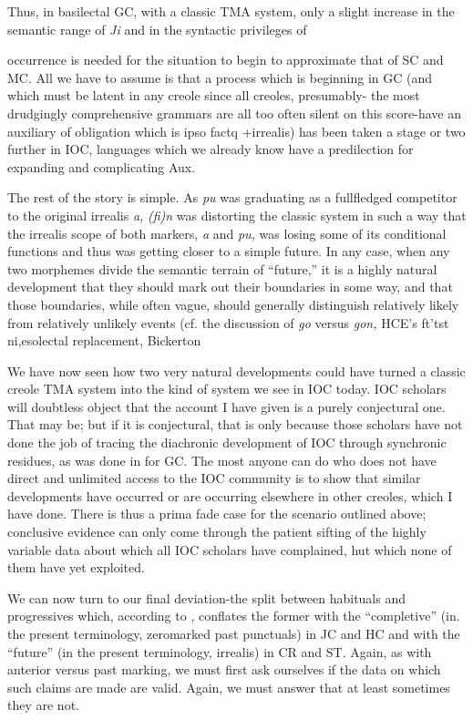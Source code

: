Thus, in basilectal GC, with a classic TMA system, only a slight increase in the semantic range of \textit{Ji} and in the syntactic privileges of

occurrence is needed for the situation to begin to approximate that of SC and MC. All we have to assume is that a process which is beginning in GC (and which must be latent in any creole since all creoles, presumably- the most drudgingly comprehensive grammars are all too often silent on this score-have an auxiliary of obligation which is ipso factq +irrealis) has been taken a stage or two further in IOC, languages which we already know have a predilection for expanding and complicating Aux.

The rest of the story is simple. As \textit{pu} was graduating as a full\-fledged competitor to the original irrealis \textit{a,} \textit{(fi)n} was distorting the classic system in such a way that the irrealis scope of both markers, \textit{a} and \textit{pu,} was losing some of its conditional functions and thus was getting closer to a simple future. In any case, when any two mor\-phemes divide the semantic terrain of ``future,'' it is a highly natural development that they should mark out their boundaries in some way, and that those boundaries, while often vague, should generally dis\-tinguish relatively likely from relatively unlikely events (cf. the discus\-sion of \textit{go} versus \textit{gon,} HCE's ft'tst ni,esolectal replacement, Bickerton

We have now seen how two very natural developments could
have turned a classic creole TMA system into the kind of system we see in IOC today. IOC scholars will doubtless object that the account I have given is a purely conjectural one. That may be; but if it is con\-jectural, that is only because those scholars have not done the job of tracing the diachronic development of IOC through synchronic resi\-dues, as was done in \citet{Bickerton1975} for GC. The most anyone can do who does not have direct and unlimited access to the IOC commun\-ity is to show that similar developments have occurred or are occurring elsewhere in other creoles, which I have done. There is thus a prima fade case for the scenario outlined above; conclusive evidence can only come through the patient sifting of the highly variable data about which all IOC scholars have complained, hut which none of them have yet exploited.

We can now turn to our final deviation-the split between habi\-tuals and progressives which, according to \citet{Taylor1971}, conflates the former with the ``completive'' (in. the present terminology, zero\-marked past punctuals) in JC and HC and with the ``future'' (in the present terminology, irrealis) in CR and ST. Again, as with anterior versus past marking, we must first ask ourselves if the data on which such claims are made are valid. Again, we must answer that at least sometimes they are not.

